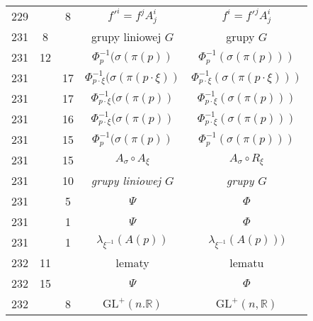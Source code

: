 \documentclass[a4paper,11pt]{article}
\newcommand{\mb}{\mathbb}
\newcommand{\mr}{\mathrm}
\newcommand{\GL}{\mr{GL}}
\newcommand{\la}{\lambda}
\newcommand{\s}{\sigma}
\newcommand{\R}{\mb{R}}
\begin{document}
\begin{center}
\begin{tabular}{|c|c|c|c|c|}
    229 & &  8 & $f'^{ i } = f^{ j } A^{ i }_{ j }$ & $f^{ i } = f'^{ j }
                                                     A^{ i }_{ j }$ \\
    231 &  8 & & grupy liniowej $G$ & grupy $G$ \\
    231 & 12 & & $\Phi^{ -1 }_{ p }( \s( \pi( p ) )$
           & $\Phi^{ -1 }_{ p }( \s( \pi( p ) ) )$ \\
    231 & & 17 & $\Phi^{ -1 }_{ p \cdot \xi }( \s( \pi( p \cdot \xi ) )$
           & $\Phi^{ -1 }_{ p \cdot \xi }( \s( \pi( p \cdot \xi ) ) )$ \\
    231 & & 17 & $\Phi^{ -1 }_{ p \cdot \xi }( \s( \pi( p ) )$
           & $\Phi^{ -1 }_{ p \cdot \xi }( \s( \pi( p ) ) )$ \\
    231 & & 16 & $\Phi^{ -1 }_{ p \cdot \xi }( \s( \pi( p ) )$
           & $\Phi^{ -1 }_{ p \cdot \xi }( \s( \pi( p ) ) )$ \\
    231 & & 15 & $\Phi^{ -1 }_{ p }( \s( \pi( p ) )$
           & $\Phi^{ -1 }_{ p }( \s( \pi( p ) ) )$ \\
    231 & & 15 & $A_{ \s } \circ A_{ \xi }$ & $A_{ \s } \circ R_{ \xi }$ \\
    231 & & 10 & \emph{grupy liniowej $G$} & \emph{grupy $G$} \\
    231 & &  5 & $\Psi$ & $\Phi$ \\
    231 & &  1 & $\Psi$ & $\Phi$ \\
    231 & &  1 & $\la_{ \xi^{ -1 } }( A( p ) )$
           & $\la_{ \xi^{ -1 } }( A( p ) ) )$ \\
    232 & 11 & & lematy & lematu \\
    232 & 15 & & $\Psi$ & $\Phi$ \\
    232 & & 8 & $\GL^{ + }( n. \R )$ & $\GL^{ + }( n, \R )$ \\ \hline
  \end{tabular}


\end{center}
\end{document}
